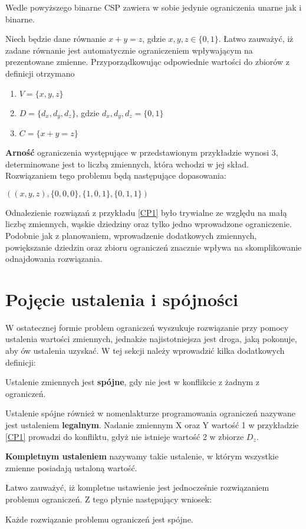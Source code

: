     Wedle powyższego binarne CSP zawiera w sobie jedynie ograniczenia unarne jak i binarne.
    \begin{example}
        \label{CP1}
        Niech będzie dane równanie $x+y=z$, gdzie $x,y,z \in \{0,1\}$. Łatwo zauważyć, iż zadane równanie jest automatycznie ograniczeniem 
        wpływającym na prezentowane zmienne. Przyporządkowując odpowiednie wartości do zbiorów z definicji \label{ConstraintProblem} otrzymano
        \begin{enumerate}
            \item $ V = \{x,y,z\} $
            \item $ D = \{d_{x},d_{y},d_{z}\}$, gdzie $d_{x},d_{y},d_{z} = \{0,1\}$
            \item $ C = \{x+y=z\}$
        \end{enumerate}
        \textbf{Arność} ograniczenia występujące w przedstawionym przykładzie wynosi 3, determinowane jest to liczbą zmiennych, która wchodzi w jej skład.
        Rozwiązaniem tego problemu będą następujące dopasowania:

        
        $((x,y,z),\{0,0,0\}, \{1,0,1\}, \{0,1,1\})$

    \end{example}
    Odnalezienie rozwiązań z przykładu \ref{CP1} było trywialne ze względu na małą liczbę zmiennych, wąskie dziedziny oraz tylko jedno wprowadzone ograniczenie.
    Podobnie jak z planowaniem, wprowadzenie dodatkowych zmiennych, powiększanie dziedzin oraz zbioru ograniczeń znacznie wpływa na skomplikowanie 
    odnajdowania rozwiązania.



\section{Pojęcie ustalenia i spójności}
    \label{SpójnośćRodział}
    W ostatecznej formie problem ograniczeń wyszukuje rozwiązanie przy pomocy ustalenia wartości zmiennych, jednakże najistotniejsza 
    jest droga, jaką pokonuje, aby ów ustalenia uzyskać. W tej sekcji należy wprowadzić kilka dodatkowych definicji:
    \begin{definition}
        Ustalenie zmiennych jest \textbf{spójne}, gdy nie jest w konflikcie z żadnym z ograniczeń.
    \end{definition}
    Ustalenie spójne również w nomenlakturze programowania ograniczeń nazywane jest ustaleniem \textbf{legalnym}.
    Nadanie zmiennym X oraz Y wartość 1 w przykładzie \ref{CP1} prowadzi do konfliktu, gdyż nie istnieje wartość 2 w zbiorze $D_{z}$.
    \begin{definition}
        \textbf{Kompletnym ustaleniem} nazywamy takie ustalenie, w którym wszystkie zmienne posiadają ustaloną wartość.
    \end{definition}
    Łatwo zauważyć, iż kompletne ustawienie jest jednocześnie rozwiązaniem problemu ograniczeń. Z tego płynie następujący wniosek:
    \begin{corollary}
        Każde rozwiązanie problemu ograniczeń jest spójne.
    \end{corollary}

